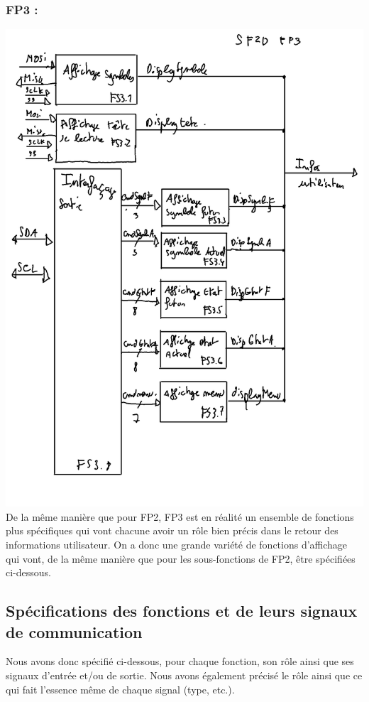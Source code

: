 \documentclass[12pt]{report}
\begin{document}
	\subsubsection{FP3 :}
	\includegraphics[width=\textwidth]{img/SF2DFP3}
	De la même manière que pour FP2, FP3 est en réalité un ensemble de fonctions plus spécifiques qui vont chacune avoir un rôle bien précis dans le retour des informations utilisateur. On a donc une grande variété de fonctions d'affichage qui vont, de la même manière que pour les sous-fonctions de FP2, être spécifiées ci-dessous.
	\subsection{Spécifications des fonctions et de leurs signaux de communication}
	Nous avons donc spécifié ci-dessous, pour chaque fonction, son rôle ainsi que ses signaux d'entrée et/ou de sortie. Nous avons également précisé le rôle ainsi que ce qui fait l'essence même de chaque signal (type, etc.).
	
\end{document}
